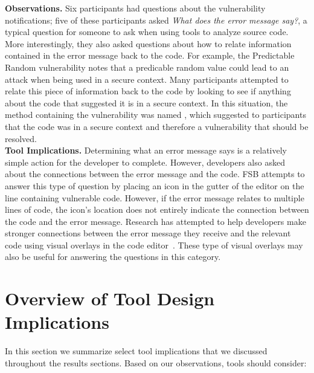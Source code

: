 \documentclass[conference]{IEEEtran}
\begin{document}
\noindent\textbf{Observations.}
Six participants had questions about the vulnerability notifications; five of these participants asked \textit{What does the error message say?}, a typical question for someone to ask when using tools to analyze source code.
More interestingly, they also asked questions about how to relate information contained in the error message back to the code. 
For example, the Predictable Random vulnerability notes that a predicable random value could lead to an attack when being used in a secure context. 
Many participants attempted to relate this piece of information back to the code by looking to see if anything about the code that suggested it is in a secure context. 
In this situation, the method containing the vulnerability was named , which suggested to participants that the code was in a secure context and therefore a vulnerability that should be resolved.
\\

\noindent\textbf{Tool Implications.}
Determining what an error message says is a relatively simple action for the developer to complete.
However, developers also asked about the connections between the error message and the code.
FSB attempts to answer this type of question by placing an icon in the gutter of the editor on the line containing vulnerable code. 
However, if the error message relates to multiple lines of code, the icon's location does not entirely indicate the connection between the code and the error message. 
Research has attempted to help developers make stronger connections between the error message they receive and the relevant code using visual overlays in the code editor~\cite{barik14visual}.
These type of visual overlays may also be useful for answering the questions in this category.

\section{Overview of Tool Design Implications}
\label{sec:disc}
In this section we summarize select tool implications that we discussed throughout the results sections.
Based on our observations, tools should consider:
\end{document}
